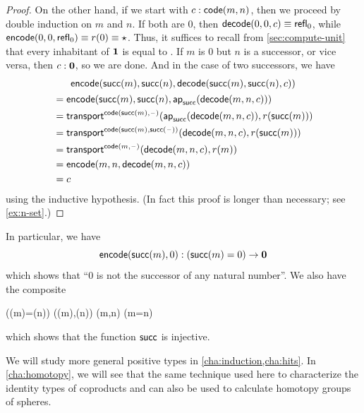 \begin{proof}
  On the other hand, if we start with $c:\mathsf{code}(m,n)$, then we proceed by double induction on $m$ and $n$.
  If both are $0$, then $\mathsf{decode}(0,0,c) \equiv \mathsf{refl}_{0}$, while $\mathsf{encode}(0,0,\mathsf{refl}_{0})\equiv r(0) \equiv \star$.
  Thus, it suffices to recall from \cref{sec:compute-unit} that every inhabitant of $\mathbf{1}$ is equal to \ttt.
  If $m$ is $0$ but $n$ is a successor, or vice versa, then $c:\mathbf{0}$, so we are done.
  And in the case of two successors, we have
  \begin{multline*}
    \mathsf{encode}(\mathsf{succ}(m),\mathsf{succ}(n),\mathsf{decode}(\mathsf{succ}(m),\mathsf{succ}(n),c))\\
    \begin{aligned}
    &= \mathsf{encode}(\mathsf{succ}(m),\mathsf{succ}(n),\mathsf{ap}_{\mathsf{succ}}(\mathsf{decode}(m,n,c)))\\
    &= \mathsf{transport}^{\mathsf{code}(\mathsf{succ}(m),{\mathord{\hspace{1pt}\text{--}\hspace{1pt}}})}(\mathsf{ap}_{\mathsf{succ}}(\mathsf{decode}(m,n,c)),r(\mathsf{succ}(m)))\\
    &= \mathsf{transport}^{\mathsf{code}(\mathsf{succ}(m),\mathsf{succ}({\mathord{\hspace{1pt}\text{--}\hspace{1pt}}}))}(\mathsf{decode}(m,n,c),r(\mathsf{succ}(m)))\\
    &= \mathsf{transport}^{\mathsf{code}(m,{\mathord{\hspace{1pt}\text{--}\hspace{1pt}}})}(\mathsf{decode}(m,n,c),r(m))\\
    &= \mathsf{encode}(m,n,\mathsf{decode}(m,n,c))\\
    &= c
  \end{aligned}
  \end{multline*}
  using the inductive hypothesis.
  (In fact this proof is longer than necessary; see \cref{ex:n-set}.)
\end{proof}

In particular, we have
\begin{equation}\label{eq:zero-not-succ}
  \mathsf{encode}(\mathsf{succ}(m),0) : (\mathsf{succ}(m)=0) \to \mathbf{0}
\end{equation}
which shows that ``$0$ is not the successor of any natural number''.
We also have the composite
\begin{narrowmultline}\label{eq:suc-injective}
  (\suc(m)=\suc(n))
  \xrightarrow{\encode} \narrowbreak
  \code(\suc(m),\suc(n))
  \jdeq \code(m,n) \xrightarrow{\decode} (m=n)
\end{narrowmultline}
which shows that the function $\mathsf{succ}$ is injective.
%

We will study more general positive types in \cref{cha:induction,cha:hits}.
In \cref{cha:homotopy}, we will see that the same technique used here to characterize the identity types of coproducts and \nat can also be used to calculate homotopy groups of spheres.

%
%

